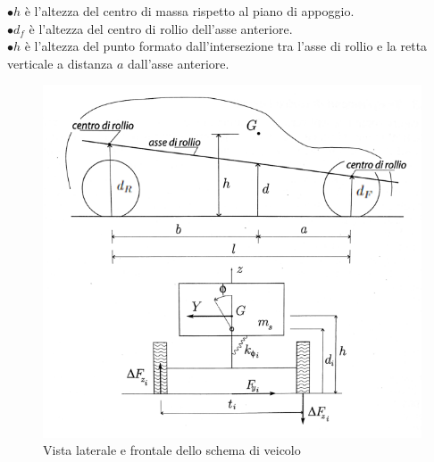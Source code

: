 $\bullet h$ è l'altezza del centro di massa rispetto al piano di appoggio.\\
$\bullet d_f$ è l'altezza del centro di rollio dell'asse anteriore.\\
$\bullet h$ è l'altezza del punto formato dall'intersezione tra l'asse di rollio e la retta verticale a distanza $a$ dall'asse anteriore.
\begin{figure}[ht]
    \centering
    \includegraphics[scale=0.8]{Immagini/Lateral dynamics/Car roll 2.png}
    \caption{Vista laterale e frontale dello schema di veicolo}
    \label{fig:rollio}
\end{figure}


